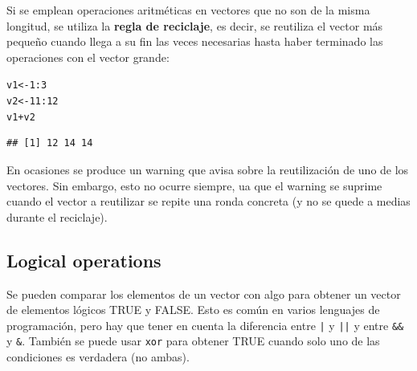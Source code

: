 \documentclass{config/apuntes}\usepackage[]{graphicx}\usepackage[]{xcolor}
\makeatletter
\newcommand{\hlnum}[1]{\textcolor[rgb]{0.686,0.059,0.569}{#1}}%
\newcommand{\hlopt}[1]{\textcolor[rgb]{0,0,0}{#1}}%
\newcommand{\hldef}[1]{\textcolor[rgb]{0.345,0.345,0.345}{#1}}%
\newcommand{\hlkwb}[1]{\textcolor[rgb]{0.69,0.353,0.396}{#1}}%
\newenvironment{kframe}{%
 \def\at@end@of@kframe{}%
 \ifinner\ifhmode%
  \def\at@end@of@kframe{\end{minipage}}%
  \begin{minipage}{\columnwidth}%
 \fi\fi%
 \def\FrameCommand##1{\hskip\@totalleftmargin \hskip-\fboxsep
 \colorbox{shadecolor}{##1}\hskip-\fboxsep
     \hskip-\linewidth \hskip-\@totalleftmargin \hskip\columnwidth}%
 \MakeFramed {\advance\hsize-\width
   \@totalleftmargin\z@ \linewidth\hsize
   \@setminipage}}%
 {\par\unskip\endMakeFramed%
 \at@end@of@kframe}
\newenvironment{knitrout}{}{} %
\newcommand{\code}[1]{\texttt{#1}}
\makeatother
\begin{document}
Si se emplean operaciones aritméticas en vectores que no son de la misma longitud, se utiliza la \textbf{regla de reciclaje}, es decir, se reutiliza el vector más pequeño cuando llega a su fin las veces necesarias hasta haber terminado las operaciones con el vector grande:

\begin{knitrout}
\color{fgcolor}\begin{kframe}
\begin{alltt}
\hldef{v1} \hlkwb{<-} \hlnum{1}\hlopt{:}\hlnum{3}
\hldef{v2} \hlkwb{<-} \hlnum{11}\hlopt{:}\hlnum{12}
\hldef{v1} \hlopt{+} \hldef{v2}
\end{alltt}


{\ttfamily\noindent\color{warningcolor}{\#\# Warning in v1 + v2: longitud de objeto mayor no es múltiplo de la longitud de uno menor}}\begin{verbatim}
## [1] 12 14 14
\end{verbatim}
\end{kframe}
\end{knitrout}

En ocasiones se produce un warning que avisa sobre la reutilización de uno de los vectores. Sin embargo, esto no ocurre siempre, ua que el warning se suprime cuando el vector a reutilizar se repite una ronda concreta (y no se quede a medias durante el reciclaje).

\subsection{Logical operations}
Se pueden comparar los elementos de un vector con algo para obtener un vector de elementos lógicos TRUE y FALSE. Esto es común en varios lenguajes de programación, pero hay que tener en cuenta la diferencia entre \code{|} y \code{||} y entre \code{\&\&} y \code{\&}. También se puede usar \code{xor} para obtener TRUE cuando solo uno de las condiciones es verdadera (no ambas).
\end{document}
